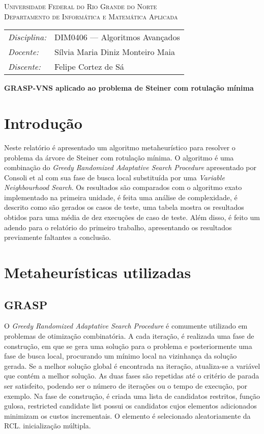 \documentclass[12pt, a4paper]{article}
\begin{document}
\begin{center}
    \textsc{Universidade Federal do Rio Grande do Norte} \\
    \textsc{Departamento de Informática e Matemática Aplicada}
\end{center}

\bigskip

\begin{tabular}{@{}ll@{}}
    \emph{Disciplina:} & DIM0406 --- Algoritmos Avançados \\
    \emph{Docente:}    & Sílvia Maria Diniz Monteiro Maia \\
    \emph{Discente:}   & Felipe Cortez de Sá \\
\end{tabular}

\bigskip

\begin{center}
\large \textbf{GRASP-VNS aplicado ao problema de Steiner com rotulação mínima}
\end{center}

\section{Introdução}
Neste relatório é apresentado um algoritmo metaheurístico para resolver o
problema da árvore de Steiner com rotulação mínima. O algoritmo é uma
combinação do \emph{Greedy Randomized Adaptative Search Procedure} apresentado
por Consoli et al \cite{consoli} com sua fase de busca local substituída por
uma \emph{Variable Neighbourhood Search}. Os resultados são comparados com o
algoritmo exato implementado na primeira unidade, é feita uma análise de
complexidade, é descrito como são gerados os casos de teste, uma tabela mostra
os resultados obtidos para uma média de dez execuções de caso de teste. Além
disso, é feito um adendo para o relatório do primeiro trabalho, apresentando os
resultados previamente faltantes a conclusão.

\section{Metaheurísticas utilizadas}
\subsection{GRASP}
O \emph{Greedy Randomized Adaptative Search Procedure} é comumente utilizado em
problemas de otimização combinatória. A cada iteração, é realizada uma fase de
construção, em que se gera uma solução para o problema e posteriormente uma
fase de busca local, procurando um mínimo local na vizinhança da solução
gerada. Se a melhor solução global é encontrada na iteração, atualiza-se a
variável que contém a melhor solução. As duas fases são repetidas até o
critério de parada ser satisfeito, podendo ser o número de iterações ou o tempo
de execução, por exemplo. Na fase de construção, é criada uma lista de
candidatos restritos,
função gulosa, restricted candidate list possui os candidatos cujos elementos
adicionados minimizam os custos incrementais. O elemento é selecionado
aleatoriamente da RCL.
inicialização múltipla.
\end{document}
